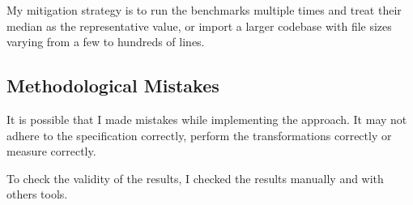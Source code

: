 My mitigation strategy is to run the benchmarks multiple times and treat their median as the representative value, or import a larger codebase with file sizes varying from a few to hundreds of lines.

\subsection{Methodological Mistakes} It is possible that I made mistakes while implementing the approach. It may not adhere to the specification correctly, perform the transformations correctly or measure correctly.

To check the validity of the results, I checked the results manually and with others tools.
